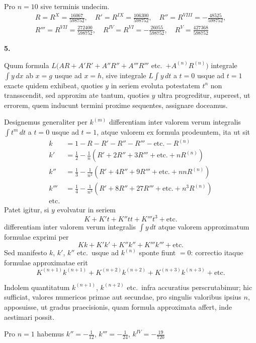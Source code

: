 \documentclass[12pt,a4paper]{article}
\newcommand{\art}[1]{\par\medskip\noindent\textbf{#1.}\par\nopagebreak\smallskip}
\begin{document}
Pro $n=10$ sive terminis undecim.
\begin{multline*}
R = R^{X} = \tfrac{16067}{598752},\quad R' = R^{IX} = \tfrac{106300}{598752},\quad R'' = R^{VIII} = -\tfrac{48525}{598752},\\
R''' = R^{VII} = \tfrac{272400}{598752},\quad R^{IV} = R^{VI} = -\tfrac{26055}{598752},\quad R^{V} = \tfrac{427368}{598752}
\end{multline*}

\art{5}

Quum formula $L(AR+A'R'+A''R''+A'''R'''$ etc.\ $+A^{(n)}R^{(n)})$ integrale $\int\!y\,dx$ ab $x=g$ usque ad $x=h$, sive integrale $L\int\!y\,dt$ a $t=0$ usque ad $t=1$ exacte quidem exhibeat, quoties $y$ in seriem evoluta potestatem $t^n$ non transscendit, sed approxim ate tantum, quoties $y$ ultra progreditur, superest, ut errorem, quem inducunt termini proxime sequentes, assignare doceamus.

Designemus generaliter per $k^{(m)}$ differentiam inter valorem verum integralis $\int\!t^m\,dt$ a $t=0$ usque ad $t=1$, atque valorem ex formula prodeuntem, ita ut sit
\begin{align*}
k &= 1 - R - R' - R'' - R''' - \text{etc.} - R^{(n)}\\
k' &= \tfrac{1}{2} - \tfrac{1}{n}(R'+2R''+3R'''+\text{etc.}+nR^{(n)})\\
k'' &= \tfrac{1}{3} - \tfrac{1}{n^2}(R'+4R''+9R'''+\text{etc.}+nnR^{(n)})\\
k''' &= \tfrac{1}{4} - \tfrac{1}{n^3}(R'+8R''+27R'''+\text{etc.}+n^3R^{(n)})\\
\text{etc.}&
\end{align*}
Patet igitur, si $y$ evolvatur in seriem
\[
K + K't + K''tt + K'''t^3 + \text{etc.}
\]
differentiam inter valorem verum integralis $\int\!y\,dt$ atque valorem approximatum formulae exprimi per
\[
Kk + K'k' + K''k'' + K'''k''' + \text{etc.}
\]
Sed manifesto $k$, $k'$, $k''$ etc.\ usque ad $k^{(n)}$ sponte fiunt $=0$: correctio itaque formulae approximatae erit
\[
K^{(n+1)}k^{(n+1)} + K^{(n+2)}k^{(n+2)} + K^{(n+3)}k^{(n+3)} + \text{etc.}
\]

Indolem quantitatum $k^{(n+1)}$, $k^{(n+2)}$ etc.\ infra accuratius perscrutabimur; hic sufficiat, valores numericos primae aut secundae, pro singulis valoribus ipsius $n$, apposuisse, ut gradus praecisionis, quam formula approximata affert, inde aestimari possit.

Pro $n=1$ habemus $k''=-\frac{1}{12}$, $k'''=-\frac{1}{24}$, $k^{IV}=-\frac{19}{720}$
\end{document}
